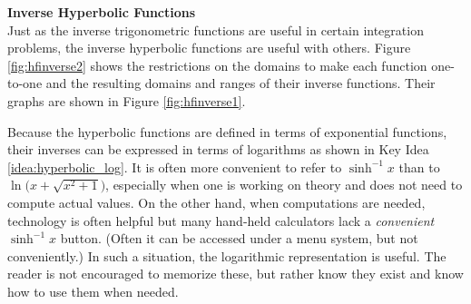 \noindent\textbf{\large Inverse Hyperbolic Functions}\\

Just as the inverse trigonometric functions are useful in certain integration problems, the inverse hyperbolic functions are useful with others. Figure \ref{fig:hfinverse2} shows the restrictions on the domains to make each function one-to-one and the resulting domains and ranges of their inverse functions. Their graphs are shown in Figure \ref{fig:hfinverse1}.

Because the hyperbolic functions are defined in terms of exponential functions, their inverses can be expressed in terms of logarithms as shown in Key Idea \ref{idea:hyperbolic_log}. It is often more convenient to refer to $\sinh^{-1}x$ than to $\ln\big(x+\sqrt{x^2+1}\big)$, especially when one is working on theory and does not need to compute actual values. On the other hand, when computations are needed, technology is often helpful but many hand-held calculators lack a \textit{convenient} $\sinh^{-1}x$ button. (Often it can be accessed under a menu system, but not conveniently.) In such a situation, the logarithmic representation is useful. The reader is not encouraged to memorize these, but rather know they exist and know how to use them when needed.


%


